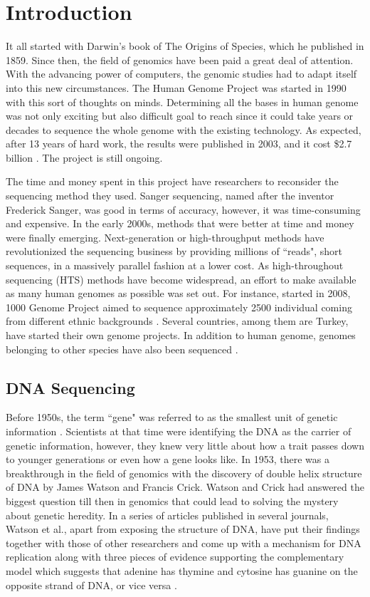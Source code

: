 \chapter{Introduction}

It all started with Darwin's book of The Origins of Species, which he published in 1859. Since then, the field of genomics have been paid a great deal of attention. With the advancing power of computers, the genomic studies had to adapt itself into this new circumstances. The Human Genome Project was started in 1990 with this sort of thoughts on minds. Determining all the bases in human genome was not only exciting but also difficult goal to reach since it could take years or decades to sequence the whole genome with the existing technology. As expected, after 13 years of hard work, the results were published in 2003, and it cost \$2.7 billion \cite{costOfHumanGenomeProject}. The project is still ongoing. 

The time and money spent in this project have researchers to reconsider the sequencing method they used. Sanger sequencing, named after the inventor Frederick Sanger, was good in terms of accuracy, however, it was time-consuming and expensive. In the early 2000s, methods that were better at time and money were finally emerging. Next-generation or high-throughput methods have revolutionized the sequencing business by providing millions of ``reads", short sequences, in a massively parallel fashion at a lower cost. As high-throughout sequencing (HTS) methods have become widespread, an effort to make available as many human genomes as possible was set out. For instance, started in 2008, 1000 Genome Project aimed to sequence approximately 2500 individual coming from different ethnic backgrounds \cite{10002015global}. Several countries, among them are Turkey, have started their own genome projects. In addition to human genome, genomes belonging to other species have also been sequenced \cite{koepfli2015genome}. 

\section{DNA Sequencing}

Before 1950s, the term ``gene" was referred to as the smallest unit of genetic information \cite{crickpapers}. Scientists at that time were identifying the DNA as the carrier of genetic information, however, they knew very little about how a trait passes down to younger generations or even how a gene looks like. In 1953, there was a breakthrough in the field of genomics with the discovery of double helix structure of DNA by James Watson and Francis Crick. Watson and Crick had answered the biggest question till then in genomics that could lead to solving the mystery about genetic heredity. In a series of articles published in several journals, Watson et al., apart from exposing the structure of DNA, have put their findings together with those of other researchers and come up with a mechanism for DNA replication along with three pieces of evidence supporting the complementary model which suggests that adenine has thymine and cytosine has guanine on the opposite strand of DNA, or vice versa \cite{watson1953structure}.

